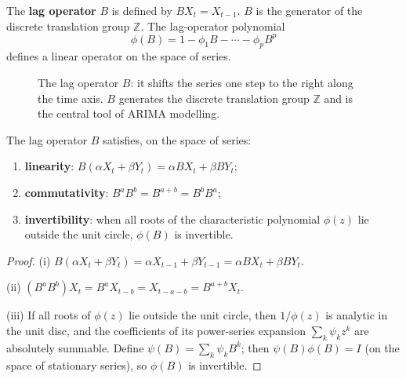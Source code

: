 \begin{definition}\label{def:ts_lag_operator}
The \textbf{lag operator} $B$ is defined by $BX_t = X_{t-1}$. $B$ is the generator of the discrete translation group $\mathbb{Z}$. The lag-operator polynomial
\[
\phi(B) = 1 - \phi_1 B - \cdots - \phi_p B^p
\]
defines a linear operator on the space of series.
\end{definition}

\begin{figure}[htbp]
\centering
{}
\caption{The lag operator $B$: it shifts the series one step to the right along the time axis. $B$ generates the discrete translation group $\mathbb{Z}$ and is the central tool of ARIMA modelling.}
\label{fig:lag_operator}
\end{figure}

\begin{property}\label{prop:ts_lag_algebra}
The lag operator $B$ satisfies, on the space of series:
\begin{enumerate}[label=(\roman*)]
    \item \textbf{linearity}: $B(\alpha X_t + \beta Y_t) = \alpha B X_t + \beta B Y_t$;
    \item \textbf{commutativity}: $B^a B^b = B^{a+b} = B^b B^a$;
    \item \textbf{invertibility}: when all roots of the characteristic polynomial $\phi(z)$ lie outside the unit circle, $\phi(B)$ is invertible.
\end{enumerate}
\end{property}

\begin{proof}
(i) $B(\alpha X_t + \beta Y_t) = \alpha X_{t-1} + \beta Y_{t-1} = \alpha BX_t + \beta BY_t$.

(ii) $(B^a B^b)X_t = B^a X_{t-b} = X_{t-a-b} = B^{a+b}X_t$.

(iii) If all roots of $\phi(z)$ lie outside the unit circle, then $1/\phi(z)$ is analytic in the unit disc, and the coefficients of its power-series expansion $\sum_k \psi_k z^k$ are absolutely summable. Define $\psi(B) = \sum_k \psi_k B^k$; then $\psi(B)\phi(B) = I$ (on the space of stationary series), so $\phi(B)$ is invertible.
\end{proof}

